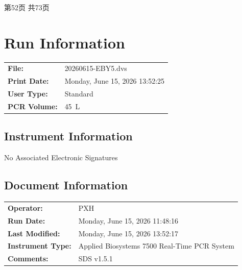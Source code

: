 \documentclass[UTF8,10pt,a4paper,fontset=fandol]{ctexart}
\newcommand{\fieldvalue}[1]{#1}
\begin{document}
\begin{center}
第52页 共73页
\end{center}

\newpage

\section*{Run Information}

\begin{tabular}{@{}ll@{}}
\textbf{File:} &
\fieldvalue{20260615-EBY5.dvs} \\[2pt]
\textbf{Print Date:} &
\fieldvalue{Monday, June 15, 2026 13:52:25} \\[2pt]
\textbf{User Type:} &
\fieldvalue{Standard} \\[2pt]
\textbf{PCR Volume:} &
\fieldvalue{45~\textmu L}
\end{tabular}

\subsection*{Instrument Information}

No Associated Electronic Signatures

\subsection*{Document Information}

\begin{tabular}{@{}ll@{}}
\textbf{Operator:} &
\fieldvalue{PXH} \\[2pt]
\textbf{Run Date:} &
\fieldvalue{Monday, June 15, 2026 11:48:16} \\[2pt]
\textbf{Last Modified:} &
\fieldvalue{Monday, June 15, 2026 13:52:17} \\[2pt]
\textbf{Instrument Type:} &
\fieldvalue{Applied Biosystems 7500 Real-Time PCR System} \\[2pt]
\textbf{Comments:} &
\fieldvalue{SDS v1.5.1}
\end{tabular}
\end{document}
